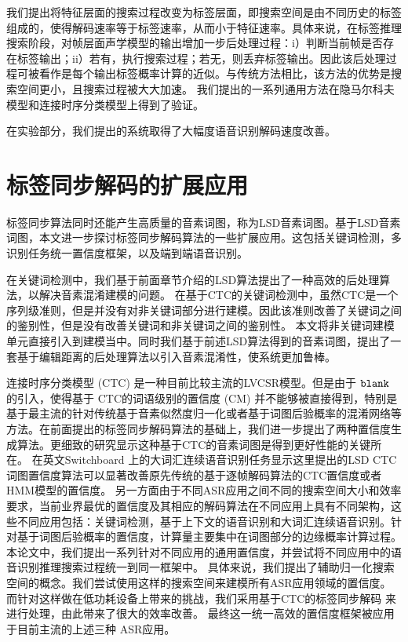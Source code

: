 我们提出将特征层面的搜索过程改变为标签层面，即搜索空间是由不同历史的标签组成的，使得解码速率等于标签速率，从而小于特征速率。具体来说，在标签推理搜索阶段，对帧层面声学模型的输出增加一步后处理过程：i）判断当前帧是否存在标签输出；ii）若有，执行搜索过程；若无，则丢弃标签输出。因此该后处理过程可被看作是每个输出标签概率计算的近似。与传统方法相比，该方法的优势是搜索空间更小，且搜索过程被大大加速。
我们提出的一系列通用方法在隐马尔科夫模型和连接时序分类模型上得到了验证。
%

在实验部分，我们提出的系统取得了大幅度语音识别解码速度改善。


\section{标签同步解码的扩展应用}
\label{chap:sum-unify}
标签同步算法同时还能产生高质量的音素词图，称为LSD音素词图。基于LSD音素词图，本文进一步探讨标签同步解码算法的一些扩展应用。这包括关键词检测，多识别任务统一置信度框架，以及端到端语音识别。

在关键词检测中，我们基于前面章节介绍的LSD算法提出了一种高效的后处理算法，以解决音素混淆建模的问题。
在基于CTC的关键词检测中，虽然CTC是一个序列级准则，但是并没有对非关键词部分进行建模。因此该准则改善了关键词之间的鉴别性，但是没有改善关键词和非关键词之间的鉴别性。
本文将非关键词建模单元直接引入到建模当中。同时我们基于前述LSD算法得到的音素词图，提出了一套基于编辑距离的后处理算法以引入音素混淆性，使系统更加鲁棒。

连接时序分类模型 (CTC) 是一种目前比较主流的LVCSR模型。但是由于 $\tt blank$ 的引入，使得基于 CTC的词语级别的置信度 (CM) 并不能够被直接得到，特别是基于最主流的针对传统基于音素似然度归一化或者基于词图后验概率的混淆网络等方法。在前面提出的标签同步解码算法的基础上，我们进一步提出了两种置信度生成算法。更细致的研究显示这种基于CTC的音素词图是得到更好性能的关键所在。
在英文Switchboard 上的大词汇连续语音识别任务显示这里提出的LSD CTC 词图置信度算法可以显著改善原先传统的基于逐帧解码算法的CTC置信度或者 HMM模型的置信度。
%
另一方面由于不同ASR应用之间不同的搜索空间大小和效率要求，当前业界最优的置信度及其相应的解码算法在不同应用上具有不同架构，这些不同应用包括：关键词检测，基于上下文的语音识别和大词汇连续语音识别。针对基于词图后验概率的置信度，计算量主要集中在词图部分的边缘概率计算过程。本论文中，我们提出一系列针对不同应用的通用置信度，并尝试将不同应用中的语音识别推理搜索过程统一到同一框架中。
%
具体来说，我们提出了辅助归一化搜索空间的概念。我们尝试使用这样的搜索空间来建模所有ASR应用领域的置信度。 %
而针对这样做在低功耗设备上带来的挑战，我们采用基于CTC的标签同步解码\cite{Chen+2016} 来进行处理，由此带来了很大的效率改善。
最终这一统一高效的置信度框架被应用于目前主流的上述三种 ASR应用。

